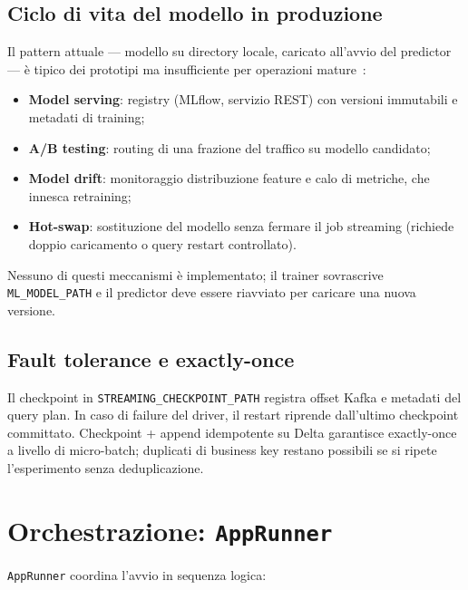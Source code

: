 \subsection{Ciclo di vita del modello in produzione}

Il pattern attuale --- modello su directory locale, caricato all'avvio del predictor --- è tipico dei prototipi ma insufficiente per operazioni mature~\cite{sculley2015hidden}:
\begin{itemize}
  \item \textbf{Model serving}: registry (MLflow, servizio REST) con versioni immutabili e metadati di training;
  \item \textbf{A/B testing}: routing di una frazione del traffico su modello candidato;
  \item \textbf{Model drift}: monitoraggio distribuzione feature e calo di metriche, che innesca retraining;
  \item \textbf{Hot-swap}: sostituzione del modello senza fermare il job streaming (richiede doppio caricamento o query restart controllato).
\end{itemize}
Nessuno di questi meccanismi è implementato; il trainer sovrascrive \texttt{ML\_MODEL\_PATH} e il predictor deve essere riavviato per caricare una nuova versione.

\subsection{Fault tolerance e exactly-once}

Il checkpoint in \texttt{STREAMING\_CHECKPOINT\_PATH} registra offset Kafka e metadati del query plan.
In caso di failure del driver, il restart riprende dall'ultimo checkpoint committato.
Checkpoint + append idempotente su Delta garantisce exactly-once a livello di micro-batch; duplicati di business key restano possibili se si ripete l'esperimento senza deduplicazione.

\section{Orchestrazione: \texttt{AppRunner}}\label{sec:app-runner}

\texttt{AppRunner} coordina l'avvio in sequenza logica:

